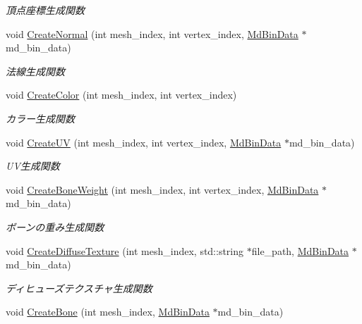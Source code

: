 \begin{DoxyCompactItemize}
\begin{DoxyCompactList}\small\item\em 頂点座標生成関数 \end{DoxyCompactList}\item 
void \mbox{\hyperlink{class_md_bin_object_a7e7b9104d1e47507e10719667f76bf1f}{Create\+Normal}} (int mesh\+\_\+index, int vertex\+\_\+index, \mbox{\hyperlink{class_md_bin_data}{Md\+Bin\+Data}} $\ast$md\+\_\+bin\+\_\+data)
\begin{DoxyCompactList}\small\item\em 法線生成関数 \end{DoxyCompactList}\item 
void \mbox{\hyperlink{class_md_bin_object_a4216a386d1d0c3335d1347415323a183}{Create\+Color}} (int mesh\+\_\+index, int vertex\+\_\+index)
\begin{DoxyCompactList}\small\item\em カラー生成関数 \end{DoxyCompactList}\item 
void \mbox{\hyperlink{class_md_bin_object_aabf80357a57db4103d43f92b24647fe5}{Create\+UV}} (int mesh\+\_\+index, int vertex\+\_\+index, \mbox{\hyperlink{class_md_bin_data}{Md\+Bin\+Data}} $\ast$md\+\_\+bin\+\_\+data)
\begin{DoxyCompactList}\small\item\em U\+V生成関数 \end{DoxyCompactList}\item 
void \mbox{\hyperlink{class_md_bin_object_a23d319ec264441ed08323a92d8c31b06}{Create\+Bone\+Weight}} (int mesh\+\_\+index, int vertex\+\_\+index, \mbox{\hyperlink{class_md_bin_data}{Md\+Bin\+Data}} $\ast$md\+\_\+bin\+\_\+data)
\begin{DoxyCompactList}\small\item\em ボーンの重み生成関数 \end{DoxyCompactList}\item 
void \mbox{\hyperlink{class_md_bin_object_a89ff9237ffdeab483a8a819fd33daeb6}{Create\+Diffuse\+Texture}} (int mesh\+\_\+index, std\+::string $\ast$file\+\_\+path, \mbox{\hyperlink{class_md_bin_data}{Md\+Bin\+Data}} $\ast$md\+\_\+bin\+\_\+data)
\begin{DoxyCompactList}\small\item\em ディヒューズテクスチャ生成関数 \end{DoxyCompactList}\item 
void \mbox{\hyperlink{class_md_bin_object_aa9408758b53b7970e8c8399c5516a89d}{Create\+Bone}} (int mesh\+\_\+index, \mbox{\hyperlink{class_md_bin_data}{Md\+Bin\+Data}} $\ast$md\+\_\+bin\+\_\+data)

\end{DoxyCompactItemize}

